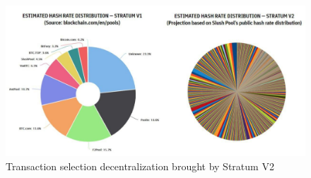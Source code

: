 \begin{figure}[h!]
    \centering
    \includegraphics[width=15cm]{Figures/sv2/sv2_3.png}
    \caption{Transaction selection decentralization brought by Stratum V2 \cite{braiinsBitcoinsDecentralization}}
    \label{fig:sv2_3}
\end{figure}